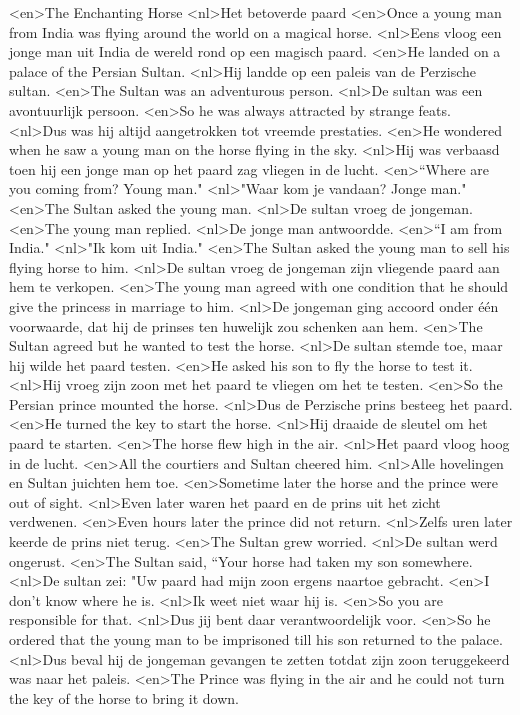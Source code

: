 <en>The Enchanting Horse
<nl>Het betoverde paard
<en>Once a young man from India was flying around the world on a magical horse.
<nl>Eens vloog een jonge man uit India de wereld rond op een magisch paard.
<en>He landed on a palace of the Persian Sultan.
<nl>Hij landde op een paleis van de Perzische sultan.
<en>The Sultan was an adventurous person.
<nl>De sultan was een avontuurlijk persoon.
<en>So he was always attracted by strange feats.
<nl>Dus was hij altijd aangetrokken tot vreemde prestaties.
<en>He wondered when he saw a young man on the horse flying in the sky.
<nl>Hij was verbaasd toen hij een jonge man op het paard zag vliegen in de lucht.
<en>“Where are you coming from? Young man."
<nl>"Waar kom je vandaan? Jonge man."
<en>The Sultan asked the young man.
<nl>De sultan vroeg de jongeman.
<en>The young man replied.
<nl>De jonge man antwoordde.
<en>“I am from India."
<nl>"Ik kom uit India."
<en>The Sultan asked the young man to sell his flying horse to him.
<nl>De sultan vroeg de jongeman zijn vliegende paard aan hem te verkopen.
<en>The young man agreed with one condition that he should give the princess in marriage to him.
<nl>De jongeman ging accoord onder één voorwaarde, dat hij de prinses ten huwelijk zou schenken aan hem.
<en>The Sultan agreed but he wanted to test the horse.
<nl>De sultan stemde toe, maar hij wilde het paard testen.
<en>He asked his son to fly the horse to test it.
<nl>Hij vroeg zijn zoon met het paard te vliegen om het te testen.
<en>So the Persian prince mounted the horse.
<nl>Dus de Perzische prins besteeg het paard.
<en>He turned the key to start the horse.
<nl>Hij draaide de sleutel om het paard te starten.
<en>The horse flew high in the air.
<nl>Het paard vloog hoog in de lucht.
<en>All the courtiers and Sultan cheered him.
<nl>Alle hovelingen en Sultan juichten hem toe.
<en>Sometime later the horse and the prince were out of sight.
<nl>Even later waren het paard en de prins uit het zicht verdwenen.
<en>Even hours later the prince did not return.
<nl>Zelfs uren later keerde de prins niet terug.
<en>The Sultan grew worried.
<nl>De sultan werd ongerust.
<en>The Sultan said, “Your horse had taken my son somewhere.
<nl>De sultan zei: "Uw paard had mijn zoon ergens naartoe gebracht.
<en>I don't know where he is.
<nl>Ik weet niet waar hij is.
<en>So you are responsible for that.
<nl>Dus jij bent daar verantwoordelijk voor.
<en>So he ordered that the young man to be imprisoned till his son returned to the palace.
<nl>Dus beval hij de jongeman gevangen te zetten totdat zijn zoon teruggekeerd was naar het paleis.
<en>The Prince was flying in the air and he could not turn the key of the horse to bring it down.
